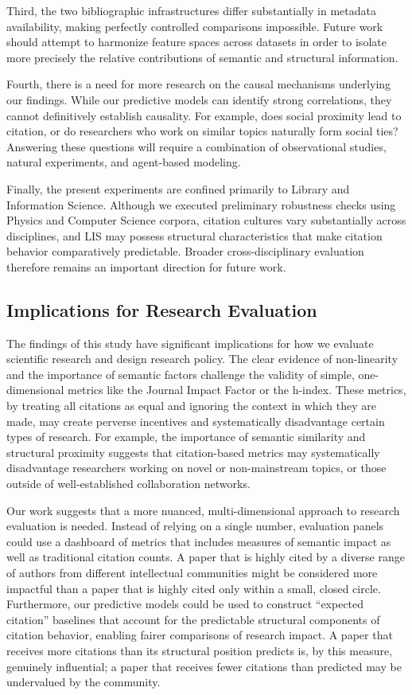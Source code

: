 \documentclass[11pt,a4paper]{article}
\begin{document}
Third, the two bibliographic infrastructures differ substantially in metadata availability, making perfectly controlled comparisons impossible. Future work should attempt to harmonize feature spaces across datasets in order to isolate more precisely the relative contributions of semantic and structural information.

Fourth, there is a need for more research on the causal mechanisms underlying our findings. While our predictive models can identify strong correlations, they cannot definitively establish causality. For example, does social proximity lead to citation, or do researchers who work on similar topics naturally form social ties? Answering these questions will require a combination of observational studies, natural experiments, and agent-based modeling.

Finally, the present experiments are confined primarily to Library and Information Science. Although we executed preliminary robustness checks using Physics and Computer Science corpora, citation cultures vary substantially across disciplines, and LIS may possess structural characteristics that make citation behavior comparatively predictable. Broader cross-disciplinary evaluation therefore remains an important direction for future work.

\subsection{Implications for Research Evaluation}

The findings of this study have significant implications for how we evaluate scientific research and design research policy. The clear evidence of non-linearity and the importance of semantic factors challenge the validity of simple, one-dimensional metrics like the Journal Impact Factor or the h-index. These metrics, by treating all citations as equal and ignoring the context in which they are made, may create perverse incentives and systematically disadvantage certain types of research. For example, the importance of semantic similarity and structural proximity suggests that citation-based metrics may systematically disadvantage researchers working on novel or non-mainstream topics, or those outside of well-established collaboration networks.

Our work suggests that a more nuanced, multi-dimensional approach to research evaluation is needed. Instead of relying on a single number, evaluation panels could use a dashboard of metrics that includes measures of semantic impact as well as traditional citation counts. A paper that is highly cited by a diverse range of authors from different intellectual communities might be considered more impactful than a paper that is highly cited only within a small, closed circle. Furthermore, our predictive models could be used to construct ``expected citation'' baselines that account for the predictable structural components of citation behavior, enabling fairer comparisons of research impact. A paper that receives more citations than its structural position predicts is, by this measure, genuinely influential; a paper that receives fewer citations than predicted may be undervalued by the community.
\end{document}
